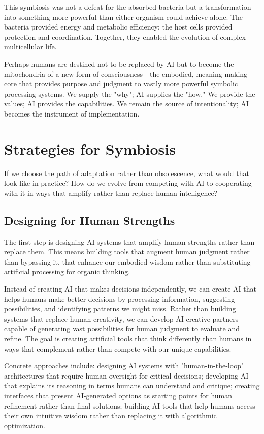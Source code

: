 This symbiosis was not a defeat for the absorbed bacteria but a transformation into something more powerful than either organism could achieve alone. The bacteria provided energy and metabolic efficiency; the host cells provided protection and coordination. Together, they enabled the evolution of complex multicellular life.

Perhaps humans are destined not to be replaced by AI but to become the mitochondria of a new form of consciousness—the embodied, meaning-making core that provides purpose and judgment to vastly more powerful symbolic processing systems. We supply the "why"; AI supplies the "how." We provide the values; AI provides the capabilities. We remain the source of intentionality; AI becomes the instrument of implementation.

\section{Strategies for Symbiosis}

If we choose the path of adaptation rather than obsolescence, what would that look like in practice? How do we evolve from competing with AI to cooperating with it in ways that amplify rather than replace human intelligence?

\subsection{Designing for Human Strengths}

The first step is designing AI systems that amplify human strengths rather than replace them. This means building tools that augment human judgment rather than bypassing it, that enhance our embodied wisdom rather than substituting artificial processing for organic thinking.

Instead of creating AI that makes decisions independently, we can create AI that helps humans make better decisions by processing information, suggesting possibilities, and identifying patterns we might miss. Rather than building systems that replace human creativity, we can develop AI creative partners capable of generating vast possibilities for human judgment to evaluate and refine. The goal is creating artificial tools that think differently than humans in ways that complement rather than compete with our unique capabilities.

Concrete approaches include: designing AI systems with "human-in-the-loop" architectures that require human oversight for critical decisions; developing AI that explains its reasoning in terms humans can understand and critique; creating interfaces that present AI-generated options as starting points for human refinement rather than final solutions; building AI tools that help humans access their own intuitive wisdom rather than replacing it with algorithmic optimization.

